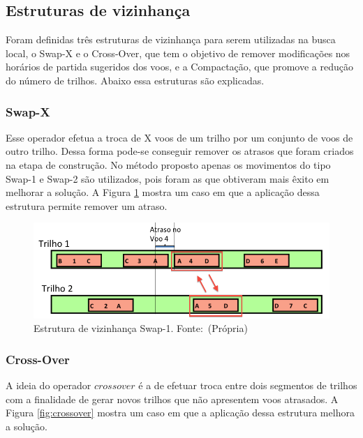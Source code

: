 \subsection{Estruturas de vizinhança}
 
Foram definidas três estruturas de vizinhança para serem utilizadas na busca
local, o Swap-X e o Cross-Over, que tem o objetivo de remover modificações nos
horários de partida sugeridos dos voos, e a Compactação, que promove a redução
do número de trilhos. Abaixo essa estruturas são explicadas.
 
\subsubsection{Swap-X}

Esse operador efetua a troca de X voos de um trilho por um conjunto de voos de
outro trilho. Dessa forma pode-se conseguir remover os atrasos que foram criados
na etapa de construção. No método proposto apenas os movimentos do tipo Swap-1
e Swap-2 são utilizados, pois foram as que obtiveram mais êxito em melhorar a
solução. A Figura \ref{fig:swap1} mostra um caso em que a aplicação dessa
estrutura permite remover um atraso.

\begin{figure}[ht]
	\caption{Estrutura de vizinhança Swap-1. \newline \mbox{Fonte:
	(Própria)}}\label{fig:swap1}
	\includegraphics[scale=0.4]{./img/swap-1}
	
\end{figure}
 
 \subsubsection{Cross-Over}
 
A ideia do operador $crossover$ é a de efetuar troca entre dois segmentos de
trilhos com a finalidade de gerar novos trilhos que não apresentem voos
atrasados. A Figura \ref{fig:crossover} mostra um caso em que a aplicação dessa
estrutura melhora a solução.


